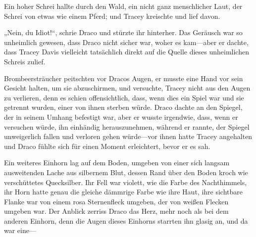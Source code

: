 Ein hoher Schrei hallte durch den Wald, ein nicht ganz menschlicher Laut, der Schrei von etwas wie einem Pferd; und Tracey kreischte und lief davon.

„Nein, du Idiot!“, schrie Draco und stürzte ihr hinterher. Das Geräusch war so unheimlich gewesen, dass Draco nicht sicher war, woher es kam—aber er dachte, dass Tracey Davis vielleicht tatsächlich direkt auf die Quelle dieses unheimlichen Schreis zulief.

%
Brombeersträucher peitschten vor Dracos Augen, er musste eine Hand vor sein Gesicht halten, um sie abzuschirmen, und versuchte, Tracey nicht aus den Augen zu verlieren, denn es schien offensichtlich, dass, wenn dies ein Spiel war und sie getrennt wurden, einer von ihnen sterben würde. Draco dachte an den Spiegel, der in seinem Umhang befestigt war, aber er wusste irgendwie, dass, wenn er versuchen würde, ihn einhändig herauszunehmen, während er rannte, der Spiegel unweigerlich fallen und verloren gehen würde—vor ihnen hatte Tracey angehalten und Draco fühlte sich für einen Moment erleichtert, bevor er es sah.

Ein weiteres Einhorn lag auf dem Boden, umgeben von einer sich langsam ausweitenden Lache aus silbernem Blut, dessen Rand über den Boden kroch wie verschüttetes Quecksilber. Ihr Fell war violett, wie die Farbe des Nachthimmels, ihr Horn hatte genau die gleiche dämmrige Farbe wie ihre Haut, ihre sichtbare Flanke war von einem rosa Sternenfleck umgeben, der von weißen Flecken umgeben war. Der Anblick zerriss Draco das Herz, mehr noch als bei dem anderen Einhorn, denn die Augen dieses Einhorns starrten ihn glasig an, und da war eine—

